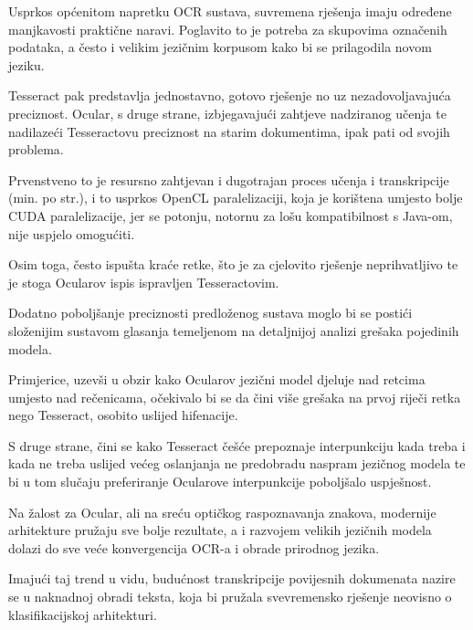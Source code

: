 \documentclass[zavrsnirad]{fer}
\begin{document}
Usprkos općenitom napretku OCR sustava, suvremena rješenja imaju određene manjkavosti praktične naravi. Poglavito to je potreba za skupovima označenih podataka, a često i velikim jezičnim korpusom kako bi se prilagodila novom jeziku.

Tesseract pak predstavlja jednostavno, gotovo rješenje no uz nezadovoljavajuća preciznost. Ocular, s druge strane, izbjegavajući zahtjeve nadziranog učenja te nadilazeći Tesseractovu preciznost na starim dokumentima, ipak pati od svojih problema.

Prvenstveno to je resursno zahtjevan i dugotrajan proces učenja i transkripcije (min. po str.), i to usprkos OpenCL paralelizaciji, koja je korištena umjesto bolje CUDA paralelizacije, jer se potonju, notornu za lošu kompatibilnost s Java-om, nije uspjelo omogućiti.

Osim toga, često ispušta kraće retke, što je za cjelovito rješenje neprihvatljivo te je stoga Ocularov ispis ispravljen Tesseractovim.

Dodatno poboljšanje preciznosti predloženog sustava moglo bi se postići složenijim sustavom glasanja temeljenom na detaljnijoj analizi grešaka pojedinih modela.

Primjerice, uzevši u obzir kako Ocularov jezični model djeluje nad retcima umjesto nad rečenicama, očekivalo bi se da čini više grešaka na prvoj riječi retka nego Tesseract, osobito uslijed hifenacije.

S druge strane, čini se kako Tesseract češće prepoznaje interpunkciju kada treba i kada ne treba uslijed većeg oslanjanja ne predobradu naspram jezičnog modela te bi u tom slučaju preferiranje Ocularove interpunkcije poboljšalo uspješnost.

Na žalost za Ocular, ali na sreću optičkog raspoznavanja znakova, modernije arhitekture pružaju sve bolje rezultate, a i razvojem velikih jezičnih modela dolazi do sve veće konvergencija OCR-a i obrade prirodnog jezika.

Imajući taj trend u vidu, budućnost transkripcije povijesnih dokumenata nazire se u naknadnoj obradi teksta, koja bi pružala svevremensko rješenje neovisno o klasifikacijskoj arhitekturi.




\end{document}
